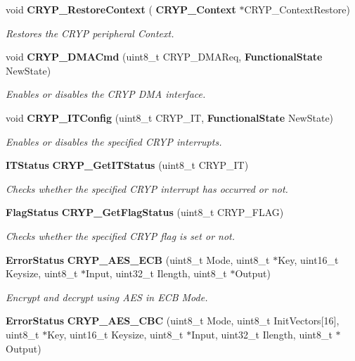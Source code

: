 \begin{DoxyCompactItemize}
void \textbf{ C\+R\+Y\+P\+\_\+\+Restore\+Context} (\textbf{ C\+R\+Y\+P\+\_\+\+Context} $\ast$C\+R\+Y\+P\+\_\+\+Context\+Restore)
\begin{DoxyCompactList}\small\item\em Restores the C\+R\+YP peripheral Context. \end{DoxyCompactList}\item 
void \textbf{ C\+R\+Y\+P\+\_\+\+D\+M\+A\+Cmd} (uint8\+\_\+t C\+R\+Y\+P\+\_\+\+D\+M\+A\+Req, \textbf{ Functional\+State} New\+State)
\begin{DoxyCompactList}\small\item\em Enables or disables the C\+R\+YP D\+MA interface. \end{DoxyCompactList}\item 
void \textbf{ C\+R\+Y\+P\+\_\+\+I\+T\+Config} (uint8\+\_\+t C\+R\+Y\+P\+\_\+\+IT, \textbf{ Functional\+State} New\+State)
\begin{DoxyCompactList}\small\item\em Enables or disables the specified C\+R\+YP interrupts. \end{DoxyCompactList}\item 
\textbf{ I\+T\+Status} \textbf{ C\+R\+Y\+P\+\_\+\+Get\+I\+T\+Status} (uint8\+\_\+t C\+R\+Y\+P\+\_\+\+IT)
\begin{DoxyCompactList}\small\item\em Checks whether the specified C\+R\+YP interrupt has occurred or not. \end{DoxyCompactList}\item 
\textbf{ Flag\+Status} \textbf{ C\+R\+Y\+P\+\_\+\+Get\+Flag\+Status} (uint8\+\_\+t C\+R\+Y\+P\+\_\+\+F\+L\+AG)
\begin{DoxyCompactList}\small\item\em Checks whether the specified C\+R\+YP flag is set or not. \end{DoxyCompactList}\item 
\textbf{ Error\+Status} \textbf{ C\+R\+Y\+P\+\_\+\+A\+E\+S\+\_\+\+E\+CB} (uint8\+\_\+t Mode, uint8\+\_\+t $\ast$Key, uint16\+\_\+t Keysize, uint8\+\_\+t $\ast$Input, uint32\+\_\+t Ilength, uint8\+\_\+t $\ast$Output)
\begin{DoxyCompactList}\small\item\em Encrypt and decrypt using A\+ES in E\+CB Mode. \end{DoxyCompactList}\item 
\textbf{ Error\+Status} \textbf{ C\+R\+Y\+P\+\_\+\+A\+E\+S\+\_\+\+C\+BC} (uint8\+\_\+t Mode, uint8\+\_\+t Init\+Vectors[16], uint8\+\_\+t $\ast$Key, uint16\+\_\+t Keysize, uint8\+\_\+t $\ast$Input, uint32\+\_\+t Ilength, uint8\+\_\+t $\ast$Output)

\end{DoxyCompactItemize}
